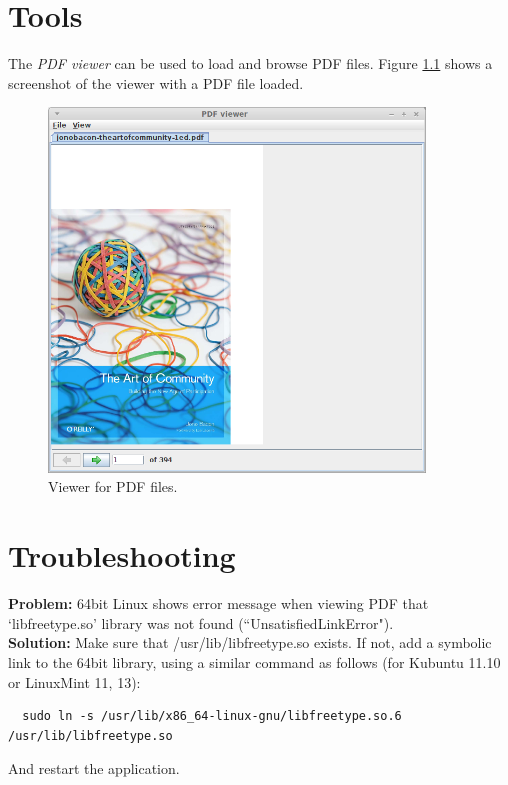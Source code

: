 \documentclass[a4paper]{book}
\begin{document}
\chapter{Tools}
The \textit{PDF viewer} can be used to load and browse PDF files. Figure 
\ref{pdf-viewer} shows a screenshot of the viewer with a PDF file loaded.

\begin{figure}[htb]
  \centering
  \includegraphics[width=10.0cm]{images/pdf-viewer.png}
  \caption{Viewer for PDF files.}
  \label{pdf-viewer}
\end{figure}

\chapter{Troubleshooting}
\begin{tight_itemize}
	\item \textbf{Problem:} 64bit Linux shows error message when viewing PDF 
	that `libfreetype.so' library was not found (``UnsatisfiedLinkError"). \\
	\textbf{Solution:} Make sure that /usr/lib/libfreetype.so exists. If not, 
	add a symbolic link to the 64bit library, using a similar command as 
	follows (for Kubuntu 11.10 or LinuxMint 11, 13):
\begin{verbatim}
  sudo ln -s /usr/lib/x86_64-linux-gnu/libfreetype.so.6 /usr/lib/libfreetype.so
\end{verbatim}
    And restart the application.
\end{tight_itemize}


\end{document}
